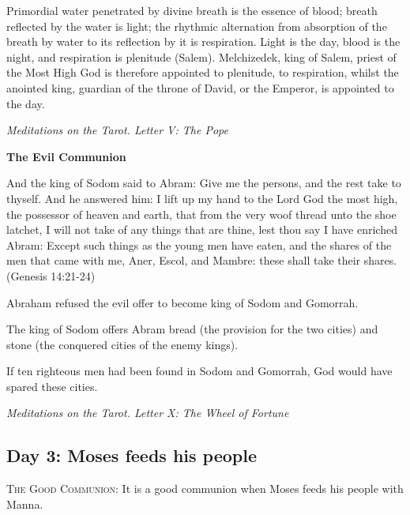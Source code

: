 \begin{quotationx}
Primordial water penetrated by divine breath is the essence of blood; breath reflected by the water is light; the
rhythmic alternation from absorption of the breath by water to its reflection by it is respiration. Light is the day,
blood is the night, and respiration is plenitude (Salem). Melchizedek, king of Salem, priest of the Most High God is
therefore appointed to plenitude, to respiration, whilst the anointed king, guardian of the throne of David, or the
Emperor, is appointed to the day. \begin{flushright} \emph{Meditations on the Tarot. Letter V: The Pope}\end{flushright}

\end{quotationx}

\textbf{The Evil Communion}

And the king of Sodom said to Abram: Give me the persons, and the rest take to thyself. And he answered him: I lift up
my hand to the Lord God the most high, the possessor of heaven and earth, that from the very woof thread unto the shoe
latchet, I will not take of any things that are thine, lest thou say I have enriched Abram: Except such things as the
young men have eaten, and the shares of the men that came with me, Aner, Escol, and Mambre: these shall take their
shares. (Genesis 14:21-24)

Abraham refused the evil offer to become king of Sodom and Gomorrah.

The king of Sodom offers Abram bread (the provision for the two cities) and stone (the conquered cities of the enemy kings).

\begin{quotationx}
If ten righteous men had been found in Sodom and Gomorrah, God would have spared these cities. \begin{flushright} \emph{Meditations on
the Tarot. Letter X: The Wheel of Fortune}\end{flushright}

\end{quotationx}

\subsection*{Day 3: Moses feeds his people}
\textsc{The Good Communion}:
It is a good communion when Moses feeds his people with Manna.


